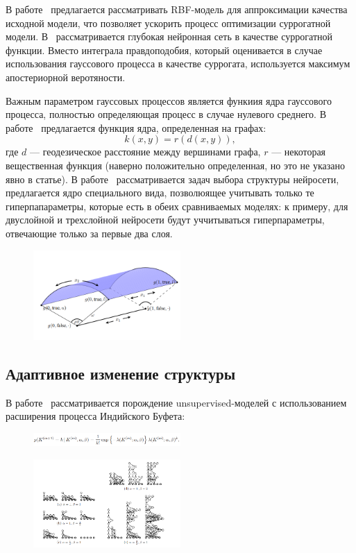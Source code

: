 В работе~\cite{rbf_surrogate} предлагается рассматривать RBF-модель для аппроксимации качества исходной модели, что позволяет ускорить процесс оптимизации суррогатной модели. В~\cite{snoek_deep} рассматривается глубокая нейронная сеть в качестве суррогатной функции. Вместо интеграла правдоподобия, который оценивается в случае использования гауссового процесса в качестве суррогата, используется максимум апостериорной веротяности.

Важным параметром гауссовых процессов является функиия ядра гауссового процесса, полностью определяющая процесс в случае нулевого среднего. В работе~\cite{gp_fusion} предлагается функция ядра, определенная на графах:
    \[
    k(x,y) = r(d(x,y)),
    \]
где $d$ --- геодезическое расстояние между вершинами графа, $r$ --- некоторая вещественная функция (наверно положительно определенная, но это не указано явно в статье).
В работе~\cite{gp_arc} рассматривается задач выбора структуры нейросети, предлагается ядро специального вида, позволюящее учитывать только те гиперпапараметры, которые есть в обеих сравниваемых моделях: к примеру, для двуслойной и трехслойной нейросети будут уччитываться гиперпараметры, отвечающие только за первые два слоя. 
\begin{figure}[H]
\includegraphics[width=0.5\textwidth]{./plots/arch_review_figs/arc.png}
\end{figure}


\subsection*{Адаптивное изменение структуры}

В работе~\cite{cib} рассматривается порождение unsupervised-моделей с использованием расширения процесса Индийского Буфета:
\begin{figure}[H]
\includegraphics[width=0.5\textwidth]{./plots/arch_review_figs/cib_eq.png}
\end{figure}
\begin{figure}[H]
\includegraphics[width=0.5\textwidth]{./plots/arch_review_figs/cib.png}
\end{figure}

